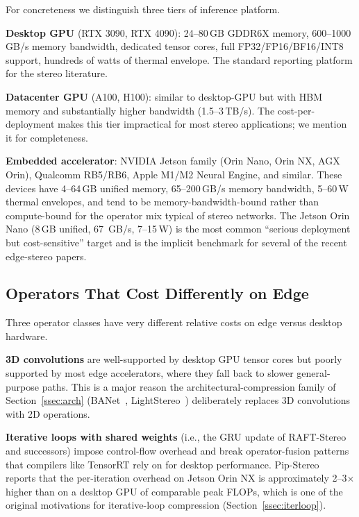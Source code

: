 For concreteness we distinguish three tiers of inference platform.

\textbf{Desktop GPU} (RTX 3090, RTX 4090): 24--80\,GB GDDR6X memory, 600--1000\,GB/s memory bandwidth, dedicated tensor cores, full FP32/FP16/BF16/INT8 support, hundreds of watts of thermal envelope. The standard reporting platform for the stereo literature.

\textbf{Datacenter GPU} (A100, H100): similar to desktop-GPU but with HBM memory and substantially higher bandwidth (1.5--3\,TB/s). The cost-per-deployment makes this tier impractical for most stereo applications; we mention it for completeness.

\textbf{Embedded accelerator}: NVIDIA Jetson family (Orin Nano, Orin NX, AGX Orin), Qualcomm RB5/RB6, Apple M1/M2 Neural Engine, and similar. These devices have 4--64\,GB unified memory, 65--200\,GB/s memory bandwidth, 5--60\,W thermal envelopes, and tend to be memory-bandwidth-bound rather than compute-bound for the operator mix typical of stereo networks. The Jetson Orin Nano (8\,GB unified, 67~GB/s, 7--15\,W) is the most common ``serious deployment but cost-sensitive'' target and is the implicit benchmark for several of the recent edge-stereo papers.

\subsection{Operators That Cost Differently on Edge}

Three operator classes have very different relative costs on edge versus desktop hardware.

\textbf{3D convolutions} are well-supported by desktop GPU tensor cores but poorly supported by most edge accelerators, where they fall back to slower general-purpose paths. This is a major reason the architectural-compression family of Section~\ref{ssec:arch} (BANet~\cite{xu2025banet}, LightStereo~\cite{guo2025lightstereo}) deliberately replaces 3D convolutions with 2D operations.

\textbf{Iterative loops with shared weights} (i.e., the GRU update of RAFT-Stereo and successors) impose control-flow overhead and break operator-fusion patterns that compilers like TensorRT rely on for desktop performance. Pip-Stereo~\cite{zheng2026pipstereo} reports that the per-iteration overhead on Jetson Orin NX is approximately 2--3$\times$ higher than on a desktop GPU of comparable peak FLOPs, which is one of the original motivations for iterative-loop compression (Section~\ref{ssec:iterloop}).


